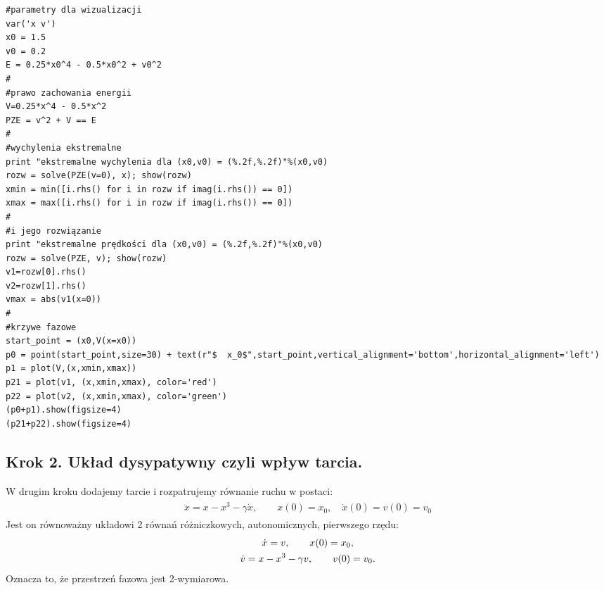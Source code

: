 \documentclass[a4paper,12pt,polish]{sphinxmanual}
\begin{document}
\begin{verbatim}
#parametry dla wizualizacji
var('x v')
x0 = 1.5
v0 = 0.2
E = 0.25*x0^4 - 0.5*x0^2 + v0^2
#
#prawo zachowania energii
V=0.25*x^4 - 0.5*x^2
PZE = v^2 + V == E
#
#wychylenia ekstremalne
print "ekstremalne wychylenia dla (x0,v0) = (%.2f,%.2f)"%(x0,v0)
rozw = solve(PZE(v=0), x); show(rozw)
xmin = min([i.rhs() for i in rozw if imag(i.rhs()) == 0])
xmax = max([i.rhs() for i in rozw if imag(i.rhs()) == 0])
#
#i jego rozwiązanie
print "ekstremalne prędkości dla (x0,v0) = (%.2f,%.2f)"%(x0,v0)
rozw = solve(PZE, v); show(rozw)
v1=rozw[0].rhs()
v2=rozw[1].rhs()
vmax = abs(v1(x=0))
#
#krzywe fazowe
start_point = (x0,V(x=x0))
p0 = point(start_point,size=30) + text(r"$  x_0$",start_point,vertical_alignment='bottom',horizontal_alignment='left')
p1 = plot(V,(x,xmin,xmax))
p21 = plot(v1, (x,xmin,xmax), color='red')
p22 = plot(v2, (x,xmin,xmax), color='green')
(p0+p1).show(figsize=4)
(p21+p22).show(figsize=4)
\end{verbatim}



\subsection{Krok 2. Układ dysypatywny czyli wpływ tarcia.}
\label{ch2/chII011:krok-2-uklad-dysypatywny-czyli-wplyw-tarcia}
W drugim  kroku dodajemy tarcie i rozpatrujemy równanie ruchu w postaci:
\label{ch2/chII011:equation-eqn12}\begin{gather}
\begin{split}\ddot x =  x - x^3 -\gamma \dot x , \qquad x(0) = x_0, \quad  \dot x(0) = v(0) =  v_0\end{split}\label{ch2/chII011-eqn12}
\end{gather}
Jest on równoważny układowi 2 równań różniczkowych, autonomicznych, pierwszego rzędu:
\label{ch2/chII011:equation-eqn13}\begin{gather}
\begin{split}\dot x = v, \qquad x(0) = x_0,\end{split}\label{ch2/chII011-eqn13}\\\begin{split}\dot v = x - x^3 -\gamma v , \qquad v(0) = v_0.\end{split}\notag
\end{gather}
Oznacza to, że przestrzeń fazowa jest 2-wymiarowa.
\end{document}

